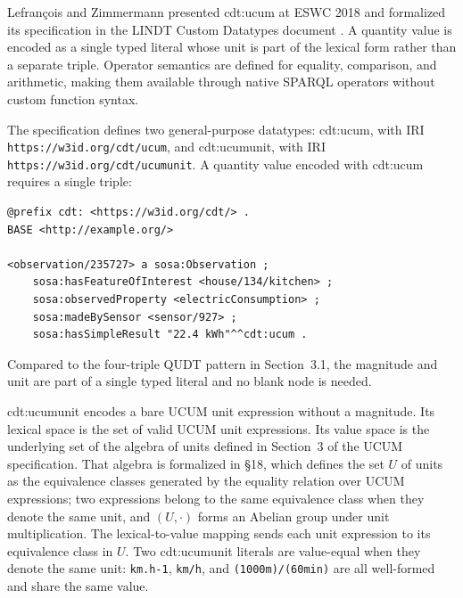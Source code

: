 Lefrançois and Zimmermann presented \textsf{cdt:ucum} at ESWC 2018 and formalized its
specification in the LINDT Custom Datatypes document \cite{lefranccois2018unified,lefrancois2021lindt}.
A quantity value is encoded as a single typed literal whose unit is part of the lexical form
rather than a separate triple. Operator semantics are defined for equality, comparison, and
arithmetic, making them available through native SPARQL operators without custom function syntax.

The specification defines two general-purpose datatypes: \textsf{cdt:ucum}, with IRI
\texttt{https://\allowbreak w3id.org/\allowbreak cdt/\allowbreak ucum}, and
\textsf{cdt:ucumunit}, with IRI
\texttt{https://\allowbreak w3id.org/\allowbreak cdt/\allowbreak ucumunit}. A quantity value
encoded with \textsf{cdt:ucum} requires a single triple:

\begin{verbatim}
@prefix cdt: <https://w3id.org/cdt/> .
BASE <http://example.org/>

<observation/235727> a sosa:Observation ;
    sosa:hasFeatureOfInterest <house/134/kitchen> ;
    sosa:observedProperty <electricConsumption> ;
    sosa:madeBySensor <sensor/927> ;
    sosa:hasSimpleResult "22.4 kWh"^^cdt:ucum .

\end{verbatim}

Compared to the four-triple QUDT pattern in Section~3.1, the magnitude and unit are part of
a single typed literal and no blank node is needed.

\textsf{cdt:ucumunit} encodes a bare UCUM unit expression without a magnitude. Its lexical
space is the set of valid UCUM unit expressions. Its value space is the underlying set of the
algebra of units defined in Section~3 of the UCUM specification. That algebra is formalized
in §18, which defines the set $U$ of units as the equivalence classes generated by the
equality relation over UCUM expressions; two expressions belong to the same equivalence class
when they denote the same unit, and $(U, \cdot)$ forms an Abelian group under unit
multiplication. The lexical-to-value mapping sends each unit expression to its equivalence
class in $U$. Two \textsf{cdt:ucumunit} literals are value-equal when they denote the same
unit: \texttt{km.h-1}, \texttt{km/h}, and \texttt{(1000m)/(60min)} are all well-formed and
share the same value.

